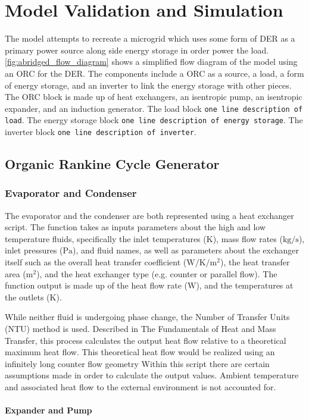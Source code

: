 \chapter{Model Validation and Simulation}
\label{ch:model}

The model attempts to recreate a microgrid which uses some form of DER as a primary power source along side energy storage in order power the load. \autoref{fig:abridged_flow_diagram} shows a simplified flow diagram of the model using an ORC for the DER. The components include a ORC as a source, a load, a form of energy storage, and an inverter to link the energy storage with other pieces. The ORC block is made up of heat exchangers, an isentropic pump, an isentropic expander, and an induction generator. The load block \verb|one line description of load|. The energy storage block \verb|one line description of energy storage|. The inverter block \verb|one line description of inverter|.



\section{Organic Rankine Cycle Generator}

\subsection{Evaporator and Condenser}
The evaporator and the condenser are both represented using a heat exchanger script.  The function takes as inputs parameters about the high and low temperature fluids, specifically the inlet temperatures ($\si{\kelvin}$), mass flow rates ($\si{\kilogram\per\second} $), inlet pressures ($\si{\pascal}$), and fluid names, as well as parameters about the exchanger itself such as the overall heat transfer coefficient ($\si{\watt\per\kelvin\per\meter\squared}$), the heat transfer area ($\si{\meter\squared}$), and the heat exchanger type (e.g. counter or parallel flow). The function output is made up of the heat flow rate ($\si{\watt}$), and the temperatures at the outlets ($\si{\kelvin}$).

While neither fluid is undergoing phase change, the Number of Transfer Units (NTU) method is used. Described in The Fundamentals of Heat and Mass Transfer, \cite{Incropera} this process calculates the output heat flow relative to a theoretical maximum heat flow. This theoretical heat flow would be realized using an infinitely long counter flow geometry
Within this script there are certain assumptions made in order to calculate the output values. Ambient temperature and associated heat flow to the external environment is not accounted for.

\subsubsection{Expander and Pump}